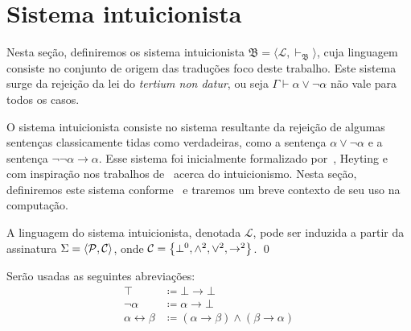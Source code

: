 \section{Sistema intuicionista}
    Nesta seção, definiremos os sistema intuicionista $\mathfrak{B}=\langle\mathcal{L},\vdash_\mathfrak{B}\rangle$, cuja linguagem consiste no conjunto de origem das traduções foco deste trabalho.
    Este sistema surge da rejeição da lei do \textit{tertium non datur}, ou seja $\Gamma\vdash\alpha\vee\neg\alpha$ não vale para todos os casos.

    O sistema intuicionista consiste no sistema resultante da rejeição de algumas sentenças classicamente tidas como verdadeiras, como a sentença $\alpha\vee\neg\alpha$ e a sentença $\neg\neg\alpha\to\alpha$.
    Esse sistema foi inicialmente formalizado por~\cite{Kolmogorov}, Heyting e~\cite{Glivenko-A, Glivenko-B} com inspiração nos trabalhos de~\cite{Brouwer-A, Brouwer-B} acerca do intuicionismo.
    Nesta seção, definiremos este sistema conforme~\cite{Troelstra} e traremos um breve contexto de seu uso na computação.

    \begin{definition}[$\mathcal{L}$]
        A linguagem do sistema intuicionista, denotada $\mathcal{L}$, pode ser induzida a partir da assinatura $\Sigma=\langle\mathcal{P},\mathcal{C}\rangle$, onde $\mathcal{C}=\left\{\bot^0,\wedge^2,\vee^2,\to^2\right\}$.
        \qed{}
    \end{definition}

    \begin{notation}
        Serão usadas as seguintes abreviações:
        \begin{align*}
            \top&\coloneqq\bot\to\bot\\
            \neg\alpha&\coloneqq\alpha\to\bot\\
            \alpha\leftrightarrow\beta&\coloneqq(\alpha\to\beta)\wedge(\beta\to\alpha)
        \end{align*}
    \end{notation}

